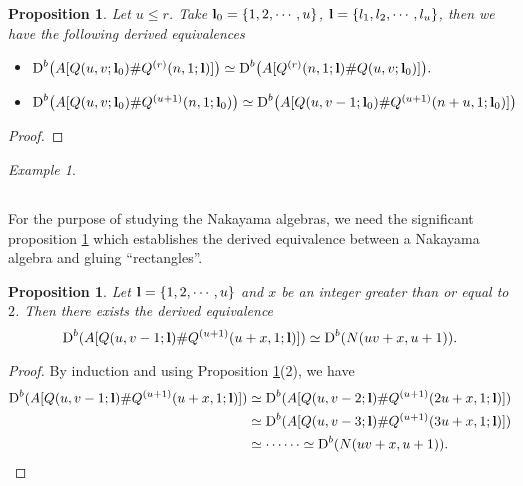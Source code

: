 \documentclass[a4paper, reqno]{amsart}
\newtheorem{prop}[thm]{Proposition}
\theoremstyle{definition}
\theoremstyle{remark}
\newtheorem{exm}[thm]{Example}
\numberwithin{equation}{section}
\begin{document}
\begin{prop}\label{Rect+Naka}
Let $u\leq r$. Take ${\bf l}_0=\{1,2,\cdots,u\}$, ${\bf l}=\{l_1,l_2,\cdots,l_u\}$, then we have the following derived equivalences
\begin{itemize}
    \item[(1)] $\textup{D}^{b}\big(A[Q(u,v;{\bf l}_0)\#Q^{(r)}(n,1;{\bf l})]\big)\simeq\textup{D}^{b}\big(A[Q^{(r)}(n,1;{\bf l})\#Q(u,v;{\bf l}_0)]\big).$
    \item[(2)] $\textup{D}^{b}\big(A[Q(u,v;{\bf l}_0)\#Q^{(u+1)}(n,1;{\bf l}_0)\big)\simeq\textup{D}^{b}\big(A[Q(u,v-1;{\bf l}_0)\#Q^{(u+1)}(n+u,1;{\bf l}_0)]\big)$
\end{itemize}
\end{prop}

\begin{proof}
    
\end{proof}

\begin{exm}
    
\end{exm}

\subsection{}
For the purpose of studying the Nakayama algebras, we need the significant proposition \ref{derivedImp} which establishes the derived equivalence between a Nakayama algebra and gluing ``rectangles''.

\begin{prop}\label{derivedImp}
Let ${\bf l}=\{1,2,\cdots,u\}$ and $x$ be an integer greater than or equal to $2$. Then there exists the derived equivalence
$$\textup{D}^{b}(A[Q(u,v-1;{\bf{l}})\#Q^{(u+1)}(u+x,1;{\bf{l}})])\simeq\textup{D}^{b}(N(uv+x,u+1)).$$
\end{prop}

\begin{proof}
By induction and using Proposition \ref{Rect+Naka}(2), we have
\begin{align*}
    \textup{D}^{b}(A[Q(u,v-1;{\bf{l}})\#Q^{(u+1)}(u+x,1;{\bf{l}})])&\simeq \textup{D}^{b}(A[Q(u,v-2;{\bf{l}})\#Q^{(u+1)}(2u+x,1;{\bf{l}})])\\
    &\simeq\textup{D}^{b}(A[Q(u,v-3;{\bf{l}})\#Q^{(u+1)}(3u+x,1;{\bf{l}})])\\
    &\simeq \cdots\cdots\simeq\textup{D}^{b}(N(uv+x,u+1)).
\end{align*}
\end{proof}
\end{document}
